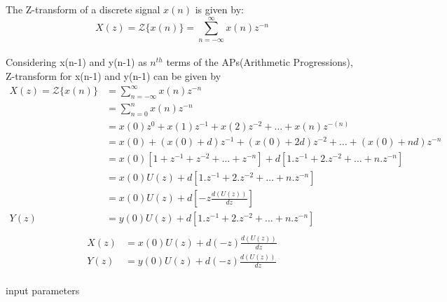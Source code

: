 \documentclass[journal,12pt,onecolumn]{IEEEtran}
\theoremstyle{remark}
\begin{document}
The Z-transform of a discrete signal $x(n)$ is given by:
\[ X(z) = \mathcal{Z}\{x(n)\} = \sum_{n=-\infty}^{\infty} x(n)z^{-n} \]
\\ Considering x(n-1) and y(n-1) as $n^{th}$ terms of the APs(Arithmetic Progressions), Z-transform for x(n-1) and y(n-1) can be given by
\begin{align}
X(z) = \mathcal{Z}\{x(n)\} 
&=\sum_{n=-\infty}^{\infty} x(n)z^{-n} \\
&=\sum_{n=0}^{n}x(n)z^{-n} \\
&=x(0)z^{0}+x(1)z^{-1}+x(2)z^{-2}+ \ldots +x(n)z^{-(n)} \\
&=x(0)+(x(0)+d)z^{-1}+(x(0)+2d)z^{-2}+ \ldots +(x(0)+nd)z^{-n} \\
&=x(0)[1+ z^{-1} + z^{-2} + \ldots + z^{-n}] + d[1.z^{-1}+2.z^{-2}+\ldots+n.z^{-n}] \\
&=x(0)U(z) + d[1.z^{-1}+2.z^{-2}+\ldots+n.z^{-n}] \\
&=x(0)U(z) + d[-z \frac {d(U(z))}{dz}] \\
Y(z)&=y(0)U(z) + d[1.z^{-1}+2.z^{-2}+\ldots+n.z^{-n}]\\
\end{align}
\begin{align}
X(z) &= x(0)U(z) + d(-z) \frac {d(U(z))}{dz}   \\
 Y(z) &= y(0)U(z) + d(-z) \frac {d(U(z))}{dz}  \\
\end{align}
\begin{table}[!ht]
    \centering
        
    \caption{input parameters}
    \label{tab:10_5_3_12}
\end{table}
\end{document}
